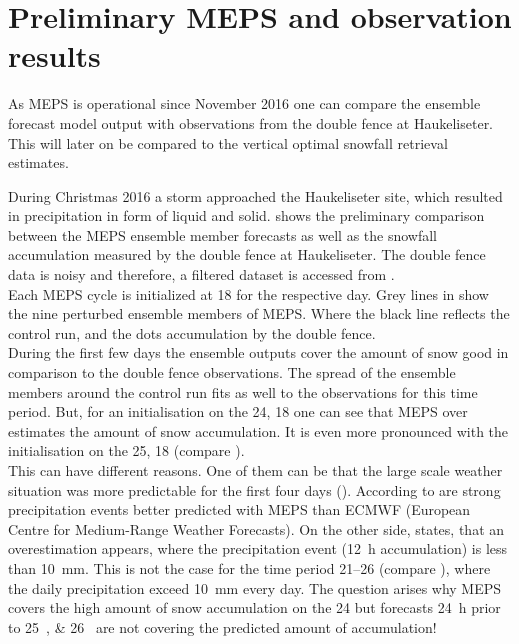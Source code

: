 \section{Preliminary MEPS and observation results}
\label{sec:PrelimMEPS}
As MEPS is operational since November 2016 one can compare the ensemble forecast model output with observations from the double fence at Haukeliseter. This will later on be compared to the vertical optimal snowfall retrieval estimates. 


\noindent
During Christmas 2016 a storm approached the Haukeliseter site, which resulted in precipitation in form of liquid and solid.
 shows the preliminary comparison between the MEPS ensemble member forecasts as well as the snowfall accumulation measured by the double fence at Haukeliseter. The double fence data is noisy and therefore, a filtered dataset is accessed from \cite{eklima_norwegian_2016}.   
\\
Each MEPS cycle is initialized at \SI{18}{\UTC} for the respective day.
Grey lines in  show the nine perturbed ensemble members of MEPS. Where the black line reflects the control run, and the dots accumulation by the double fence.
\\
During the first few days the ensemble outputs cover the amount of snow good in comparison to the double fence observations.
The spread of the ensemble members around the control run fits as well to the observations for this time period. But, for an initialisation on the \SI{24}{\dec}, \SI{18}{\UTC} one can see that  MEPS over estimates the amount of snow accumulation. It is even more pronounced with the initialisation on the \SI{25}{\dec}, \SI{18}{\UTC} (compare ). 
\\
This can have different reasons. One of them can be that the large scale weather situation was more predictable for the first four days (). 
According to \cite{muller_arome-metcoop:_2017} are strong precipitation events better predicted with MEPS than ECMWF (European Centre for Medium-Range Weather Forecasts). On the other side, \cite{muller_arome-metcoop:_2017} states, that an overestimation appears, where the precipitation event (\SI{12}{\hour} accumulation) is less than \SI{10}{\mm}. This is not the case for the time period \SIrange{21}{26}{\dec} (compare ), where the daily precipitation exceed \SI{10}{\mm} every day. The question arises why MEPS covers the high amount of snow accumulation on the \SI{24}{\dec} but forecasts \SI{24}{\hour} prior to \SIlist{25;26}{\dec} are not covering the predicted amount of accumulation!